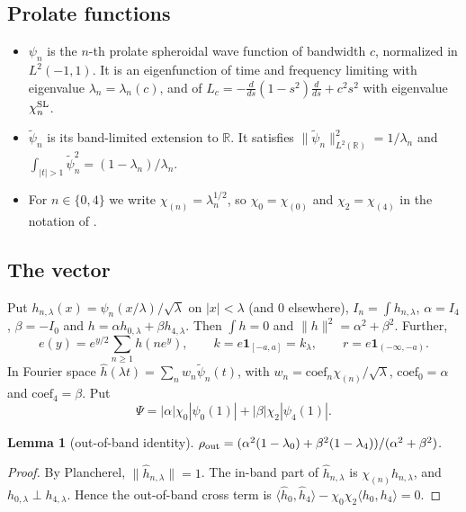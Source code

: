\documentclass[11pt]{amsart}
\newtheorem{lemma}[proposition]{Lemma}
\theoremstyle{remark}
\numberwithin{equation}{section}
\newcommand{\R}{\mathbb{R}}
\begin{document}
\subsection{Prolate functions}
\begin{itemize}
\item $\psi_n$ is the $n$-th prolate spheroidal wave function of bandwidth $c$, normalized in $L^2(-1,1)$. It is an eigenfunction of time and frequency limiting with eigenvalue $\lambda_n=\lambda_n(c)$, and of $L_c=-\frac d{ds}(1-s^2)\frac d{ds}+c^2s^2$ with eigenvalue $\chi_n^{\rm SL}$.
\item $\tilde\psi_n$ is its band-limited extension to $\R$. It satisfies $\|\tilde\psi_n\|_{L^2(\R)}^2=1/\lambda_n$ and $\int_{|t|>1}\tilde\psi_n^2=(1-\lambda_n)/\lambda_n$.
\item For $n\in\{0,4\}$ we write $\chi_{(n)}=\lambda_n^{1/2}$, so $\chi_0=\chi_{(0)}$ and $\chi_2=\chi_{(4)}$ in the notation of \cite{CCM25,MoriWWUB}.
\end{itemize}

\subsection{The vector}
Put $h_{n,\lambda}(x)=\psi_n(x/\lambda)/\sqrt\lambda$ on $|x|<\lambda$ (and $0$ elsewhere), $I_n=\int h_{n,\lambda}$, $\alpha=I_4$, $\beta=-I_0$ and $h=\alpha h_{0,\lambda}+\beta h_{4,\lambda}$. Then $\int h=0$ and $\|h\|^2=\alpha^2+\beta^2$. Further,
\[
e(y)=e^{y/2}\sum_{n\ge1}h(ne^y),\qquad k=e\mathbf 1_{[-a,a]}=k_\lambda,\qquad r=e\mathbf 1_{(-\infty,-a)}.
\]
In Fourier space $\hat h(\lambda t)=\sum_nw_n\tilde\psi_n(t)$, with $w_n=\mathrm{coef}_n\chi_{(n)}/\sqrt\lambda$, $\mathrm{coef}_0=\alpha$ and $\mathrm{coef}_4=\beta$. Put
\[
\Psi=|\alpha|\chi_0|\psi_0(1)|+|\beta|\chi_2|\psi_4(1)|.
\]

\begin{lemma}[out-of-band identity]\label{lem:L0}
$\rho_{\rm out}=(\alpha^2(1-\lambda_0)+\beta^2(1-\lambda_4))/(\alpha^2+\beta^2)$.
\end{lemma}
\begin{proof}
By Plancherel, $\|\hat h_{n,\lambda}\|=1$. The in-band part of $\hat h_{n,\lambda}$ is $\chi_{(n)}h_{n,\lambda}$, and $h_{0,\lambda}\perp h_{4,\lambda}$. Hence the out-of-band cross term is $\langle\hat h_0,\hat h_4\rangle-\chi_0\chi_2\langle h_0,h_4\rangle=0$.
\end{proof}
\end{document}
